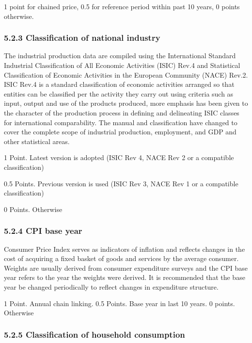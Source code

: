 \documentclass[]{article}
\begin{document}
1 point for chained price, 0.5 for reference period within past 10
years, 0 points otherwise.

\hypertarget{classification-of-national-industry}{%
\subsubsection{5.2.3 Classification of national
industry}\label{classification-of-national-industry}}

The industrial production data are compiled using the International
Standard Industrial Classification of All Economic Activities (ISIC)
Rev.4 and Statistical Classification of Economic Activities in the
European Community (NACE) Rev.2. ISIC Rev.4 is a standard classification
of economic activities arranged so that entities can be classified per
the activity they carry out using criteria such as input, output and use
of the products produced, more emphasis has been given to the character
of the production process in defining and delineating ISIC classes for
international comparability. The manual and classification have changed
to cover the complete scope of industrial production, employment, and
GDP and other statistical areas.

1 Point. Latest version is adopted (ISIC Rev 4, NACE Rev 2 or a
compatible classification)

0.5 Points. Previous version is used (ISIC Rev 3, NACE Rev 1 or a
compatible classification)

0 Points. Otherwise

\hypertarget{cpi-base-year}{%
\subsubsection{5.2.4 CPI base year}\label{cpi-base-year}}

Consumer Price Index serves as indicators of inflation and reflects
changes in the cost of acquiring a fixed basket of goods and services by
the average consumer.\\
Weights are usually derived from consumer expenditure surveys and the
CPI base year refers to the year the weights were derived. It is
recommended that the base year be changed periodically to reflect
changes in expenditure structure.

1 Point. Annual chain linking. 0.5 Points. Base year in last 10 years. 0
points. Otherwise

\hypertarget{classification-of-household-consumption}{%
\subsubsection{5.2.5 Classification of household
consumption}\label{classification-of-household-consumption}}
\end{document}
